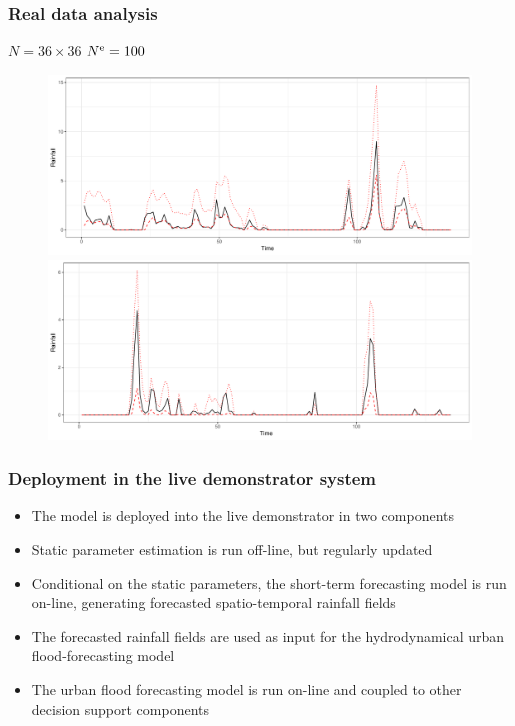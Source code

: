 \begin{frame}
  \frametitle{Real data analysis}
  \mbox{} \hfill $N = 36 \times 36$ \quad ${N^\text{e}}=100$
\begin{figure}[h!]
\begin{center}
        \includegraphics[width=0.8\linewidth, clip, trim = 0 0 0 0]{post_med_uq_radar_location.pdf} \vspace{0.5cm}
                \includegraphics[width=0.8\linewidth, clip, trim = 0 0 0 0]{post_med_uq_radar_location_2.pdf}
\end{center}
\end{figure}
\end{frame}

\begin{frame}
  \frametitle{Deployment in the live demonstrator system}
  \begin{itemize}
  \item The model is deployed into the live demonstrator in two components
  \item Static parameter estimation is run off-line, but regularly updated
  \item Conditional on the static parameters, the short-term forecasting model is run on-line, generating forecasted spatio-temporal rainfall fields
  \item The forecasted rainfall fields are used as input for the hydrodynamical urban flood-forecasting model
    \item The urban flood forecasting model is run on-line and coupled to other decision support components
  \end{itemize}
\end{frame}

